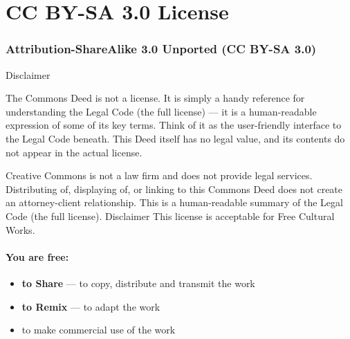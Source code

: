 
\chapter{CC BY-SA 3.0 License}
\subsection*{Attribution-ShareAlike 3.0 Unported  (CC BY-SA 3.0) }
Disclaimer

  The Commons Deed is not a license. It is simply a handy reference for understanding the Legal Code (the full license) — it is a human-readable expression of some of its key terms. Think of it as the user-friendly interface to the Legal Code beneath. This Deed itself has no legal value, and its contents do not appear in the actual license. 


  Creative Commons is not a law firm and does not provide legal services. Distributing of, displaying of, or linking to this Commons Deed does not create an attorney-client relationship. 
 This is a human-readable summary of the Legal Code (the full license).  Disclaimer  This license is acceptable for Free Cultural Works. \subsubsection*{You are free:}
\begin{itemize}
\item \textbf{to Share}
--- to copy, distribute and transmit the work 
\item \textbf{to Remix}
--- to adapt the work 
\item  to make commercial use of the work 

\end{itemize}

